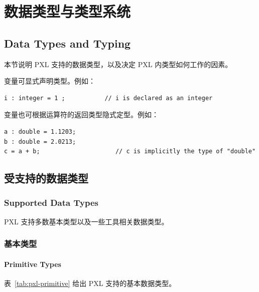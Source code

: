 \section{数据类型与类型系统}
\subsection*{Data Types and Typing}

本节说明 PXL 支持的数据类型，以及决定 PXL 内类型如何工作的因素。

变量可显式声明类型。例如：
\begin{lstlisting}[style=pxl]
i : integer = 1 ;           // i is declared as an integer
\end{lstlisting}

变量也可根据运算符的返回类型隐式定型。例如：
\begin{lstlisting}[style=pxl]
a : double = 1.1203;
b : double = 2.0213;
c = a + b;                     // c is implicitly the type of "double"
\end{lstlisting}

\subsection{受支持的数据类型}
\subsubsection*{Supported Data Types}

PXL 支持多数基本类型以及一些工具相关数据类型。

\subsubsection{基本类型}
\paragraph*{Primitive Types}

表~\ref{tab:pxl-primitive} 给出 PXL 支持的基本数据类型。

